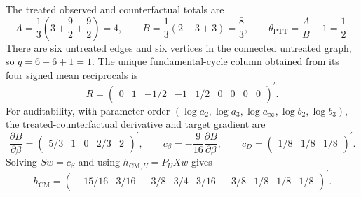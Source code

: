 The treated observed and counterfactual totals are
\[
A=\frac13\left(3+\frac92+\frac92\right)=4,
\qquad
B=\frac13(2+3+3)=\frac83,
\qquad
\theta_{\mathrm{PTT}}=\frac{A}{B}-1=\frac12.                           \tag{2}
\]
There are six untreated edges and six vertices in the connected untreated graph, so
\(q=6-6+1=1\).  The unique fundamental-cycle column obtained from its four signed mean reciprocals is
\[
R=
\begin{pmatrix}
0&1&-1/2&-1&1/2&0&0&0&0
\end{pmatrix}^{\prime}.                                                  \tag{3}
\]
For auditability, with parameter order
\((\log a_2,\log a_3,\log a_\infty,\log b_2,\log b_3)\), the treated-counterfactual derivative and target gradient are
\[
\frac{\partial B}{\partial\beta}
=\begin{pmatrix}5/3&1&0&2/3&2\end{pmatrix}^{\prime},
\qquad
c_\beta=-\frac9{16}\frac{\partial B}{\partial\beta},
\qquad
c_D=\begin{pmatrix}1/8&1/8&1/8\end{pmatrix}^{\prime}.                  \tag{4}
\]
Solving \(S w=c_\beta\) and using
\(h_{\mathrm{CM},U}=P_UXw\) gives
\[
h_{\mathrm{CM}}=
\begin{pmatrix}
-15/16&3/16&-3/8&3/4&3/16&-3/8&1/8&1/8&1/8
\end{pmatrix}^{\prime}.                                                  \tag{5}
\]

